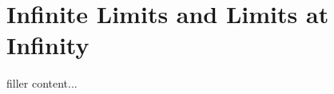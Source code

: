 \section{Infinite Limits and Limits at Infinity}\label{sec:infinite-limits-and-limits-at-infinity}

filler content...

